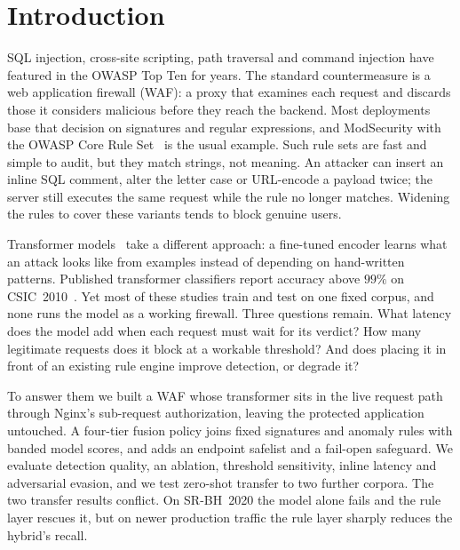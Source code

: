 \documentclass[conference]{IEEEtran}
\begin{document}
\section{Introduction}
SQL injection, cross-site scripting, path traversal and command injection
have featured in the OWASP Top Ten for years. The standard countermeasure
is a web application firewall (WAF): a proxy that examines each request and
discards those it considers malicious before they reach the backend. Most
deployments base that decision on signatures and regular expressions, and
ModSecurity with the OWASP Core Rule Set~\cite{owaspcrs} is the usual
example. Such rule sets are fast and simple to audit, but they match
strings, not meaning. An attacker can insert an inline SQL comment, alter
the letter case or URL-encode a payload twice; the server still executes the
same request while the rule no longer matches. Widening the rules to
cover these variants tends to block genuine users.

Transformer models~\cite{vaswani2017attention,devlin2019bert} take a
different approach: a fine-tuned encoder learns what an attack looks like
from examples instead of depending on hand-written patterns. Published
transformer classifiers report accuracy above $99\%$ on
CSIC~2010~\cite{wadbert2026,scireports2024novelxsssqli}. Yet most of these
studies train and test on one fixed corpus, and none runs the model as a
working firewall. Three questions remain. What latency does the
model add when each request must wait for its verdict? How many legitimate
requests does it block at a workable threshold? And does placing it in
front of an existing rule engine improve detection, or degrade it?

To answer them we built a WAF whose transformer sits in the live request
path through Nginx's sub-request authorization, leaving the protected
application untouched. A four-tier fusion policy joins fixed signatures and
anomaly rules with banded model scores, and adds an endpoint safelist and a
fail-open safeguard. We evaluate detection quality, an ablation, threshold
sensitivity, inline latency and adversarial evasion, and we test zero-shot
transfer to two further corpora. The two transfer results conflict. On
SR-BH~2020 the model alone fails and the rule layer rescues it, but on newer
production traffic the rule layer sharply reduces the hybrid's recall.
\end{document}

